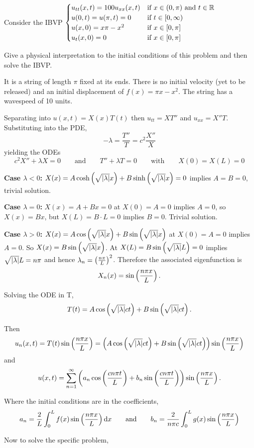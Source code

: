Consider the IBVP $
\begin{cases}
    u_{tt}(x,t) = 100u_{xx}(x,t) & \text{if } x \in (0, \pi) \text{ and } t \in \mathbb{R}\\
    u(0,t) = u(\pi,t) = 0 & \text{if } t \in [0,\infty)\\
    u(x, 0) = x\pi - x^2 &\text{if } x \in [0,\pi]\\
    u_t(x,0) = 0 &\text{if } x \in [0,\pi]\\
\end{cases} $

Give a physical interpretation to the initial conditions of this problem and then solve
the IBVP.

\soln* 
It is a string of length $\pi$ fixed at its ends. There is no initial velocity (yet to be released) and an initial displacement of $f(x) = \pi x - x^2$. The string has a wavespeed of 10 units.

\nnl Separating into $u(x,t) = X(x)T(t)$ then $u_{tt} = XT''$ and $u_{xx} = X''T$. Substituting into the PDE, $$-\lambda = \frac{T''}{T} = c^2 \frac{X''}{X}$$ yielding the ODEs
$$c^2 X'' + \lambda X = 0 \qquad\text{and}\qquad T'' + \lambda T = 0 \qquad \text{with}\qquad X(0)=X(L)=0$$

\nnl \textbf{Case $\lambda < 0$:}
$X(x) = A\coshp{\rabsl x} + B \sinhp{\rabsl x} = 0$ implies $A = B = 0$, trivial solution. 

\nnl \textbf{Case $\lambda = 0$:}
$X(x) = A + Bx = 0$ at $X(0) = A = 0$ implies $A = 0$, so $X(x) = Bx$, but $X(L) = B \cdot L = 0$ implies $B = 0$. Trivial solution. 

\nnl \textbf{Case $\lambda > 0$:}
$X(x) = A\cosp{\rabsl x} + B \sinp{\rabsl x}$ at $X(0) = A = 0$ implies $A = 0$. So $X(x) =  B \sinp{\rabsl x}$. At $X(L) = B \sinp{\rabsl L} = 0$ implies $\sqrt{\abs{\lambda}} L = n \pi$ and hence $\lambda_n = \pfrac{\np}{L}^2$. 
Therefore the associated eigenfunction is 
$$X_n(x) = \sinp{\npxl}.$$

\nnl Solving the ODE in T,
$$T(t) = A \cosp{\rabsl ct} + B \sinp{\rabsl ct}.$$

Then
$$u_n(x,t) = T(t) \sinp{\npxl} = \pars{ A \cosp{\rabsl ct} + B \sinp{\rabsl ct}} \sinp{\npxl}$$
and 
$$u(x,t) = \sumn{1} \pars{ a_n \cosp{\cunt} + b_n \sinp{\cunt}} \sinp{\npxl}.$$

Where the initial conditions are in the coefficients,
$$a_n =  \frac{2}{L} \intl f(x) \sinp{\npxl} \dd x \qquad \text{and} \qquad b_n = \frac{2}{\np c} \intl g(x) \sinp{\npxl} $$ 


\nnl 
Now to solve the specific problem, 

